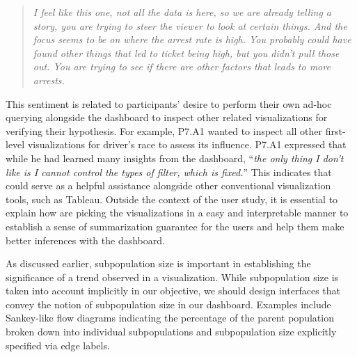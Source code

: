 \begin{quote}
\textit{I feel like this one, not all the data is here, so we are already telling a story, you are trying to steer the viewer to look at certain things. And the focus seems to be on where the arrest rate is high. You probably could have found other things that led to ticket being high, but you didn't pull those out. You are trying to see if there are other factors that leads to more arrests.}
\end{quote}
\npar This sentiment is related to participants' desire to perform their own ad-hoc querying alongside the dashboard to inspect other related visualizations for verifying their hypothesis. For example, P7.A1 wanted to inspect all other first-level visualizations for driver's race to assess its influence. P7.A1 expressed that while he had learned many insights from the dashboard, ``\textit{the only thing I don't like is I cannot control the types of filter, which is fixed.}'' This indicates that \system could serve as a helpful assistance alongside other conventional visualization tools, such as Tableau. Outside the context of the user study, it is essential to explain how \system are picking the visualizations in a easy and interpretable manner to establish a sense of summarization guarantee for the users and help them make better inferences with the dashboard.
\par As discussed earlier, subpopulation size is important in establishing the significance of a trend observed in a visualization. While subpopulation size is taken into account implicitly in our objective, we should design interfaces that convey the notion of subpopulation size in our dashboard. Examples include Sankey-like flow diagrams indicating the percentage of the parent population broken down into individual subpopulations and subpopulation size explicitly specified via edge labels.%
